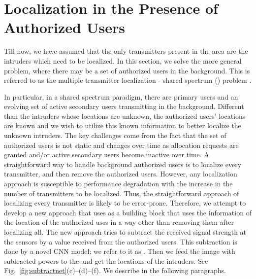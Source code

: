\section{Localization in the Presence of Authorized Users}
\label{sec:authorized}

Till now, we have assumed that the only transmitters present in the area are the intruders which need to be localized. In this section, we solve the more general \mtl problem, where there may be a set of authorized users in the background. 
This is referred to as the multiple transmitter localization - shared spectrum (\mtlss) problem \cite{ipsn20-mtl}.

In particular, in a shared spectrum paradigm, there are primary users and an evolving set of active secondary users transmitting in the background.
Different than the intruders whose locations are unknown, the authorized users' locations are known and we wish to utilize this known information to better localize the unknown intruders.
The key challenges come from the fact that the set of authorized users is not static and changes over time as allocation requests are granted and/or active secondary users become inactive over time.
A straightforward way to handle background authorized users is to localize every transmitter, and then remove the authorized users. 
However, any localization approach is susceptible to performance degradation with the increase in the number of transmitters to be localized.
Thus, the straightforward approach of localizing every transmitter is likely to be error-prone.
Therefore, we attempt to develop a new approach that uses \our as a building block that uses the information of the location of the authorized uses in a way other than removing them after localizing all.
The new approach tries to subtract the received signal strength at the sensors by a value received from the authorized users.
This subtraction is done by a novel CNN model; we refer to it as \subtract.
Then we feed the image with subtracted powers to the \our and get the locations of the intruders.
See Fig.~\ref{fig:subtractnet}(c)--(d)--(f).
We describe \subtract in the following paragraphs.


